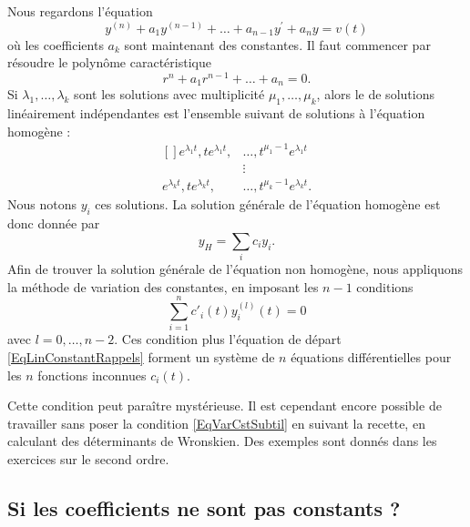 Nous regardons l'équation
\begin{equation}	\label{EqLinConstantRappels}
	y^{(n)} + a_1 y^{(n-1)} + \ldots + a_{n-1} y^\prime + a_n y = v(t)
\end{equation}
où les coefficients $a_k$ sont maintenant des constantes. Il faut commencer par résoudre le polynôme caractéristique
\begin{equation}
	r^n+a_1 r^{n-1}+\ldots +a_n=0.
\end{equation}
Si $\lambda_1,\ldots,\lambda_k$ sont les solutions avec multiplicité $\mu_1,\ldots,\mu_k$, alors le  de solutions linéairement indépendantes est l'ensemble suivant de solutions à l'équation homogène :
\begin{equation}
	\begin{aligned}[]
		 e^{\lambda_1 t},t e^{\lambda_1 t},	&	\ldots,t^{\mu_1-1} e^{\lambda_1  t}\\
							&\vdots\\
		 e^{\lambda_k t},t e^{\lambda_k t},	&\ldots,t^{\mu_k-1} e^{\lambda_k  t}.
	\end{aligned}
\end{equation}
Nous notons $y_i$ ces solutions. La solution générale de l'équation homogène est donc donnée par
\begin{equation}
	y_H=\sum_i c_i y_i.
\end{equation}
Afin de trouver la solution générale de l'équation non homogène, nous appliquons la méthode de variation des constantes, en imposant les $n-1$ conditions
\begin{equation}		\label{EqVarCstSubtil}
	\sum_{i=1}^n c'_i(t)y_i^{(l)}(t)=0
\end{equation}
avec $l=0,\ldots,n-2$. Ces condition plus l'équation de départ \eqref{EqLinConstantRappels} forment un système de $n$ équations différentielles pour les $n$ fonctions inconnues $c_i(t)$.

Cette condition peut paraître mystérieuse. Il est cependant encore possible de travailler sans poser la condition \eqref{EqVarCstSubtil} en suivant la recette, en calculant des déterminants de Wronskien. Des exemples sont donnés dans les exercices sur le second ordre.

\subsection{Si les coefficients ne sont pas constants ?}

